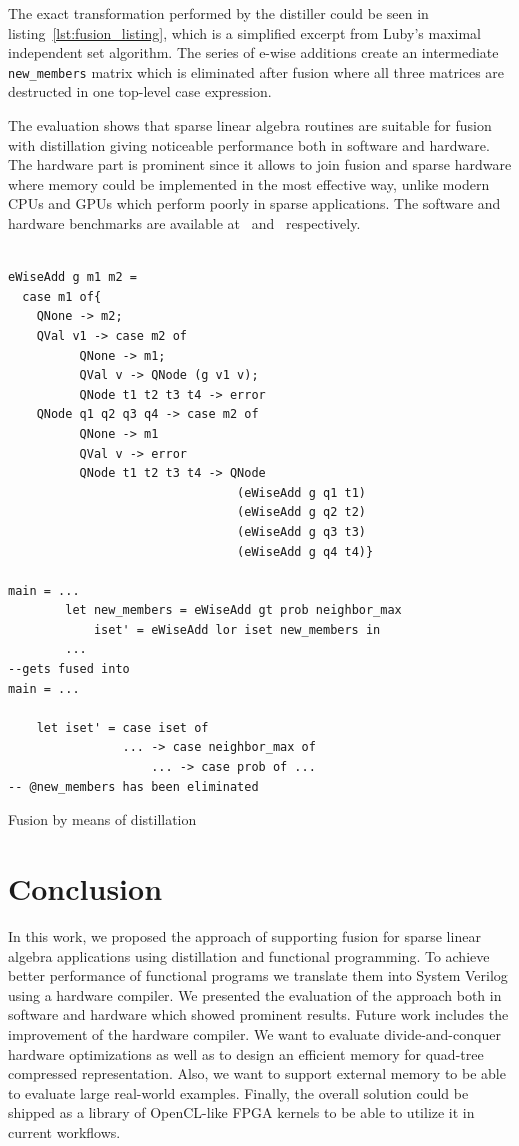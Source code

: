 \documentclass[10pt,conference]{IEEEtran}
\begin{document}
The exact transformation performed by the distiller could be seen in listing~\ref{lst:fusion_listing}, which is a simplified excerpt from Luby’s maximal independent set algorithm. The series of e-wise additions create an intermediate \texttt{new\_members} matrix which is eliminated after fusion where all three matrices are destructed in one top-level case expression.

The evaluation shows that sparse linear algebra routines are suitable for fusion with distillation giving noticeable performance both in software and hardware. The hardware part is prominent since it allows to join fusion and sparse hardware where memory could be implemented in the most effective way, unlike modern CPUs and GPUs which perform poorly in sparse applications. The software and hardware benchmarks are available at~\cite{YaccPOT} and~\cite{FHWME} respectively.

\begin{listing}

  \begin{verbatim}

eWiseAdd g m1 m2 =
  case m1 of{
    QNone -> m2;
    QVal v1 -> case m2 of
          QNone -> m1;
          QVal v -> QNode (g v1 v);
          QNode t1 t2 t3 t4 -> error
    QNode q1 q2 q3 q4 -> case m2 of 
          QNone -> m1
          QVal v -> error
          QNode t1 t2 t3 t4 -> QNode
                                (eWiseAdd g q1 t1)
                                (eWiseAdd g q2 t2)
                                (eWiseAdd g q3 t3)
                                (eWiseAdd g q4 t4)}

main = ...
        let new_members = eWiseAdd gt prob neighbor_max 
            iset' = eWiseAdd lor iset new_members in
        ...
--gets fused into
main = ...

    let iset' = case iset of
                ... -> case neighbor_max of
                    ... -> case prob of ...
-- @new_members has been eliminated
  \end{verbatim}
  \caption{Fusion by means of distillation}
  \label{lst:fusion_listing}
  
\end{listing}

\section{Conclusion}

In this work, we proposed the approach of supporting fusion for sparse linear algebra applications using distillation and functional programming.
To achieve better performance of functional programs we translate them into System Verilog using a hardware compiler. We presented the evaluation of the approach both in software and hardware which showed prominent results.
Future work includes the improvement of the hardware compiler. We want to evaluate divide-and-conquer hardware optimizations as well as to design an efficient memory for quad-tree compressed representation.
Also, we want to support external memory to be able to evaluate large real-world examples. Finally, the overall solution could be shipped as a library of OpenCL-like FPGA kernels to be able to utilize it in current workflows.
\end{document}
